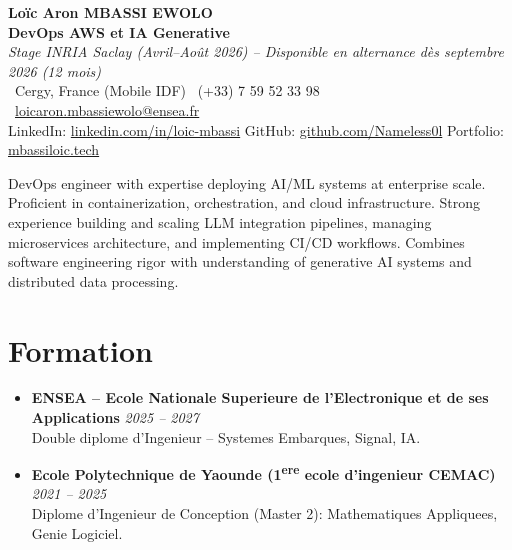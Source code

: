 \documentclass[a4paper,11pt]{article}
\begin{document}
\begin{center}
    {\Large \textbf{Lo\"ic Aron MBASSI EWOLO}} \\ \vspace{4pt}
    \textbf{\large DevOps AWS et IA Generative} \\
    \textit{\small Stage INRIA Saclay (Avril--Ao\^ut 2026) -- Disponible en alternance d\`es septembre 2026 (12 mois)} \\ \vspace{4pt}
    \small
    \Pointinghand\ Cergy, France (Mobile IDF) \quad
    \Mobilefone\ (+33) 7 59 52 33 98 \quad
    {\color{primary}\Letter\ \href{mailto:loicaron.mbassiewolo@ensea.fr}{loicaron.mbassiewolo@ensea.fr}} \\ \vspace{2pt}
    {\color{primary}LinkedIn: \href{https://www.linkedin.com/in/loic-mbassi/}{linkedin.com/in/loic-mbassi}} \quad
    {\color{primary}GitHub: \href{https://github.com/Nameless0l}{github.com/Nameless0l}} \quad
    {\color{primary}Portfolio: \href{https://mbassiloic.tech}{mbassiloic.tech}}
\end{center}
\vspace{-6pt}

\noindent\small{DevOps engineer with expertise deploying AI/ML systems at enterprise scale. Proficient in containerization, orchestration, and cloud infrastructure. Strong experience building and scaling LLM integration pipelines, managing microservices architecture, and implementing CI/CD workflows. Combines software engineering rigor with understanding of generative AI systems and distributed data processing.}

\section{Formation}
\begin{itemize}[leftmargin=*, label=\tiny$\bullet$, nosep]
    \item \textbf{ENSEA -- Ecole Nationale Superieure de l'Electronique et de ses Applications} \hfill \textit{2025 -- 2027} \\
    \small{Double diplome d'Ingenieur -- Systemes Embarques, Signal, IA.}
    \item \textbf{Ecole Polytechnique de Yaounde (1\textsuperscript{ere} ecole d'ingenieur CEMAC)} \hfill \textit{2021 -- 2025} \\
    \small{Diplome d'Ingenieur de Conception (Master 2): Mathematiques Appliquees, Genie Logiciel.}
\end{itemize}
\end{document}
